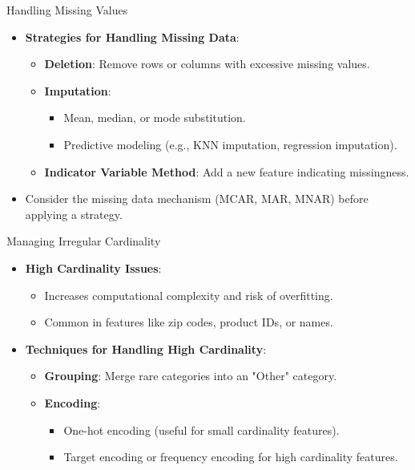 \documentclass[aspectratio=169,xcolor=dvipsnames]{beamer}
\begin{document}
\begin{frame}{Handling Missing Values}
\begin{itemize}
    \setlength\itemsep{0.5cm}
    \item \textbf{Strategies for Handling Missing Data}:
    \begin{itemize}
        \item \textbf{Deletion}: Remove rows or columns with excessive missing values.
        \item \textbf{Imputation}:
        \begin{itemize}
            \item Mean, median, or mode substitution.
            \item Predictive modeling (e.g., KNN imputation, regression imputation).
        \end{itemize}
        \item \textbf{Indicator Variable Method}: Add a new feature indicating missingness.
    \end{itemize}
    \item Consider the missing data mechanism (MCAR, MAR, MNAR) before applying a strategy.
\end{itemize}
\end{frame}

\begin{frame}{Managing Irregular Cardinality}
\begin{itemize}
    \setlength\itemsep{0.25cm}
    \item \textbf{High Cardinality Issues}:
    \begin{itemize}
        \item Increases computational complexity and risk of overfitting.
        \item Common in features like zip codes, product IDs, or names.
    \end{itemize}
    \item \textbf{Techniques for Handling High Cardinality}:
    \begin{itemize}
        \item \textbf{Grouping}: Merge rare categories into an "Other" category.
        \item \textbf{Encoding}:
        \begin{itemize}
            \item One-hot encoding (useful for small cardinality features).
            \item Target encoding or frequency encoding for high cardinality features.
        \end{itemize}
    \end{itemize}
\end{itemize}
\end{frame}
\end{document}
